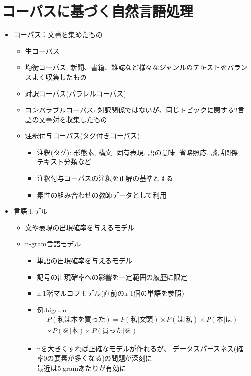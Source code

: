 \documentclass[a4j,11pt]{jsarticle}
\begin{document}
\section{コーパスに基づく自然言語処理}
\begin{itemize}
 \item コーパス：文書を集めたもの
       \begin{itemize}
	\item 生コーパス
	\item 均衡コーパス: 新聞、書籍、雑誌など様々なジャンルのテキストをバランスよく収集したもの
	\item 対訳コーパス(パラレルコーパス)
	\item コンパラブルコーパス: 対訳関係ではないが、同じトピックに関する2言語の文書対を収集したもの
	\item 注釈付与コーパス(タグ付きコーパス)
	      \begin{itemize}
	       \item 注釈(タグ): 形態素, 構文, 固有表現, 語の意味, 省略照応, 談話関係, テキスト分類など
	       \item 注釈付与コーパスの注釈を正解の基準とする
	       \item 素性の組み合わせの教師データとして利用
	      \end{itemize}
       \end{itemize}
 \item 言語モデル
       \begin{itemize}
	\item 文や表現の出現確率を与えるモデル
	\item n-gram言語モデル
	      \begin{itemize}
	       \item 単語の出現確率を与えるモデル
	       \item 記号の出現確率への影響を一定範囲の履歴に限定
	       \item n-1階マルコフモデル(直前のn-1個の単語を参照)
	       \item 例:bigram
		     \begin{eqnarray*}
		      P(私は本を買った) = P(私|文頭) \times P(は|私) \times P(本|は) \\
		       \times P(を|本) \times P(買った|を)
		     \end{eqnarray*}
	       \item nを大きくすれば正確なモデルが作れるが、
		     データスパースネス(確率0の要素が多くなる)の問題が深刻に\\
		     最近は5-gramあたりが有効に
	      \end{itemize}

\end{itemize}
\end{itemize}
\end{document}
